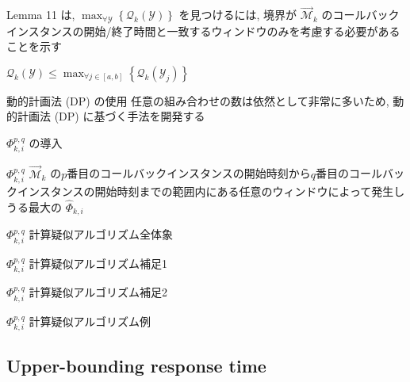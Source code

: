 \begin{frame}[label=lemma11]{Lemma 11}
     は, $\max _{\forall \mathcal{Y}}\left\{\mathcal{Q}_{k}(\mathcal{Y})\right\}$ を見つけるには, 境界が $\overrightarrow{\mathcal{M}}_{k}$ のコールバックインスタンスの開始/終了時間と一致するウィンドウのみを考慮する必要があることを示す
    \begin{lemma}[]
        $\mathcal{Q}_{k}(\mathcal{Y}) \leq \max _{\forall j \in[a, b]}\left\{\mathcal{Q}_{k}\left(\mathcal{Y}_{j}\right)\right\}$
    \end{lemma}
\end{frame}

\begin{frame}{動的計画法 (DP) の使用}
    任意の組み合わせの数は依然として非常に多いため, 動的計画法 (DP) に基づく手法を開発する
\end{frame}

\begin{frame}{$\Phi_{k, i}^{p, q}$ の導入}
    \begin{block}{$\Phi_{k, i}^{p, q}$}
        $\overrightarrow{\mathcal{M}}_{k}$ の$ p $番目のコールバックインスタンスの開始時刻から$ q $番目のコールバックインスタンスの開始時刻までの範囲内にある任意のウィンドウによって発生しうる最大の $\hat{\Phi}_{k, i}$
    \end{block}
\end{frame}

\begin{frame}{$\Phi_{k, i}^{p, q}$ 計算疑似アルゴリズム全体象}
\end{frame}

\begin{frame}{$\Phi_{k, i}^{p, q}$ 計算疑似アルゴリズム補足1}
\end{frame}

\begin{frame}{$\Phi_{k, i}^{p, q}$ 計算疑似アルゴリズム補足2}
\end{frame}

\begin{frame}{$\Phi_{k, i}^{p, q}$ 計算疑似アルゴリズム例}
\end{frame}


\subsection{Upper-bounding response time}
\label{ssec: upper bounding response time}

